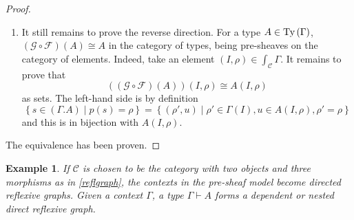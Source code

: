 \documentclass[12pt,a4paper,twoside,xetex]{book} %
\newtheorem{example}[theorem]{Example}
\begin{document}
\begin{proof}
\begin{enumerate}
\item It still remains to prove the reverse direction. For a type $A \in 
\text{Ty}\left(\Gamma\right)$, $(\mathcal{G} \circ \mathcal{F}) (A ) 
\cong A$ in the category of types, being pre-sheaves on the category of 
elements. Indeed, take an element $(I,\rho) \in \int_{\mathcal{C}} \Gamma$. It 
remains to prove that  $$((\mathcal{G} \circ \mathcal{F}) (A )) (I,\rho) \cong 
A(I,\rho) $$ as sets. The left-hand side is by definition $$\left\{ s \in 
(\Gamma . A) \mid p(s) = \rho \right\} = \left\{ (\rho ', u) \mid \rho ' \in 
\Gamma (I), u \in A(I,\rho), \rho ' = \rho \right\}$$ and this is in bijection 
with  $A(I,\rho)$. 
\end{enumerate}
The equivalence has been proven.
\end{proof}

\begin{example}
If $\mathcal{C}$ is chosen to be the category with two 
objects and three morphisms as in \cref{reflgraph}, the contexts in the pre-sheaf model become directed reflexive graphs. Given a 
context $\Gamma$, a type $\Gamma \vdash A$ forms a dependent or nested direct reflexive graph. 
 
\end{example}
\end{document}
